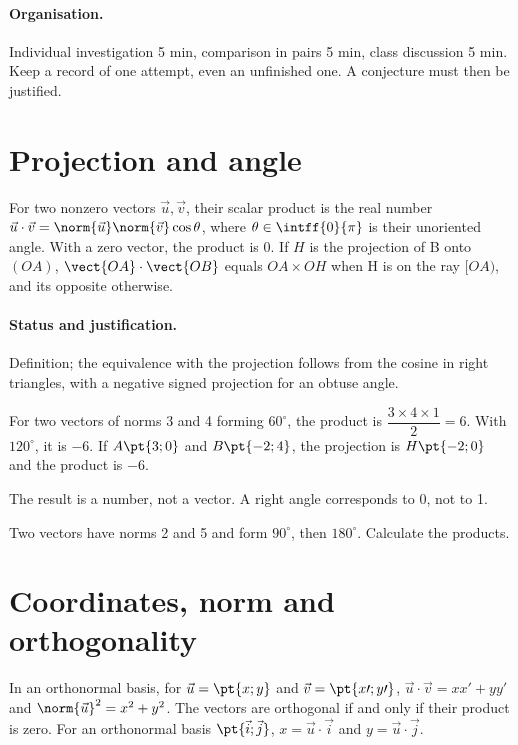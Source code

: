 \paragraph{Organisation.} Individual investigation 5 min, comparison in pairs 5 min, class discussion 5 min. Keep a record of one attempt, even an unfinished one. A conjecture must then be justified.
\mxnewpage
\section{Projection and angle}\label{C03-U1}
\begin{keypoint}
For two nonzero vectors $\vec u,\vec v$, their scalar product is the real number $\vec u\cdot\vec v=\norm{\vec u}\norm{\vec v}\cos\theta$, where $\theta\in\intff{0}{\pi}$ is their unoriented angle. With a zero vector, the product is 0. If $H$ is the projection of B onto $(OA)$, $\vect{OA}\cdot\vect{OB}$ equals $OA\times OH$ when H is on the ray $[OA)$, and its opposite otherwise.
\end{keypoint}
\paragraph{Status and justification.} Definition; the equivalence with the projection follows from the cosine in right triangles, with a negative signed projection for an obtuse angle.
\begin{example}For two vectors of norms 3 and 4 forming $60^\circ$, the product is $\dfrac{3\times 4\times 1}{2}=6$. With $120^\circ$, it is $-6$. If $A\pt{3;0}$ and $B\pt{-2;4}$, the projection is $H\pt{-2;0}$ and the product is $-6$.\end{example}\label{C03-EX1}
\begin{pitfall}The result is a number, not a vector. A right angle corresponds to 0, not to 1.\end{pitfall}
\begin{application}Two vectors have norms 2 and 5 and form $90^\circ$, then $180^\circ$. Calculate the products.\end{application}\label{C03-AP1}
\section{Coordinates, norm and orthogonality}\label{C03-U2}
\begin{keypoint}
In an orthonormal basis, for $\vec u=\pt{x;y}$ and $\vec v=\pt{x\prime;y\prime}$, $\vec u\cdot\vec v=xx\prime+yy\prime$ and $\norm{\vec u}^2=x^2+y^2$. The vectors are orthogonal if and only if their product is zero. For an orthonormal basis $\pt{\vec i;\vec j}$, $x=\vec u\cdot\vec i$ and $y=\vec u\cdot\vec j$.
\end{keypoint}
